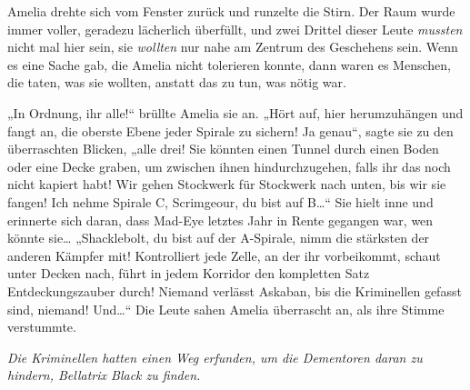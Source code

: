 Amelia drehte sich vom Fenster zurück und runzelte die Stirn. Der Raum wurde immer voller, geradezu lächerlich überfüllt, und zwei Drittel dieser Leute \emph{mussten} nicht mal hier sein, sie \emph{wollten} nur nahe am Zentrum des Geschehens sein. Wenn es eine Sache gab, die Amelia nicht tolerieren konnte, dann waren es Menschen, die taten, was sie wollten, anstatt das zu tun, was nötig war.

„In Ordnung, ihr alle!“ brüllte Amelia sie an.
„Hört auf, hier herumzuhängen und fangt an, die oberste Ebene jeder Spirale zu sichern! Ja genau“, sagte sie zu den überraschten Blicken, „alle drei! Sie könnten einen Tunnel durch einen Boden oder eine Decke graben, um zwischen ihnen hindurchzugehen, falls ihr das noch nicht kapiert habt! Wir gehen Stockwerk für Stockwerk nach unten, bis wir sie fangen! Ich nehme Spirale C, Scrimgeour, du bist auf B…“ Sie hielt inne und erinnerte sich daran, dass Mad-Eye letztes Jahr in Rente gegangen war, wen könnte sie…
„Shacklebolt, du bist auf der A-Spirale, nimm die stärksten der anderen Kämpfer mit! Kontrolliert jede Zelle, an der ihr vorbeikommt, schaut unter Decken nach, führt in jedem Korridor den kompletten Satz Entdeckungszauber durch! Niemand verlässt Askaban, bis die Kriminellen gefasst sind, niemand! Und…“ Die Leute sahen Amelia überrascht an, als ihre Stimme verstummte.

\emph{Die Kriminellen hatten einen Weg erfunden, um die Dementoren daran zu hindern, Bellatrix Black zu finden.}

